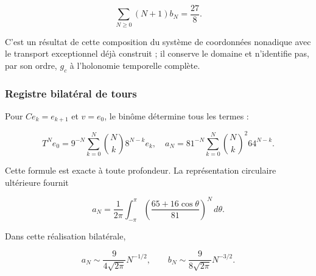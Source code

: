 \begin{equation}
\sum_{N\geq0}(N+1)b_N=\frac{27}{8}.
\label{nuc03:eq:17}
\end{equation}

C’est un résultat de cette composition du système de coordonnées nonadique avec le transport exceptionnel déjà construit ; il conserve le domaine et n’identifie pas, par son ordre, \(g_c\) à l’holonomie temporelle complète.

\subsubsection{Registre bilatéral de tours}

Pour \(C e_k=e_{k+1}\) et \(v=e_0\), le binôme détermine tous les termes :

\begin{equation}
T^Ne_0=9^{-N}\sum_{k=0}^{N}\binom{N}{k}8^{N-k}e_k,
\quad
a_N=81^{-N}\sum_{k=0}^{N}\binom{N}{k}^{\!2}64^{N-k}.
\label{nuc03:eq:18}
\end{equation}

Cette formule est exacte à toute profondeur. La représentation circulaire ultérieure fournit

\begin{equation}
a_N=\frac1{2\pi}\int_{-\pi}^{\pi}
\left(\frac{65+16\cos\theta}{81}\right)^N\,d\theta.
\label{nuc03:eq:19}
\end{equation}

\begin{theorem}
Dans cette réalisation bilatérale,

\begin{equation}
\boxed{a_N\sim\frac9{4\sqrt{2\pi}}N^{-1/2},\qquad
b_N\sim\frac9{8\sqrt{2\pi}}N^{-3/2}.}
\label{nuc03:eq:20}
\end{equation}
\end{theorem}

